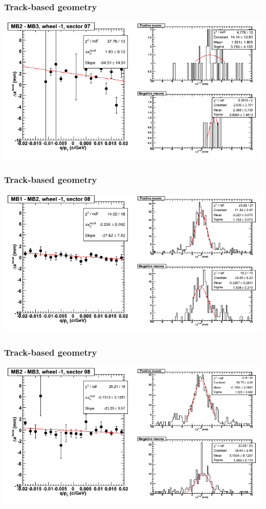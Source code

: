 \documentclass[compress]{beamer}
\begin{document}
\begin{frame}
\frametitle{Track-based geometry}
\includegraphics[width=\linewidth]{NOV4_segdiffs/dt13_resid_B_07_23.png}
\end{frame}

\begin{frame}
\frametitle{Track-based geometry}
\includegraphics[width=\linewidth]{NOV4_segdiffs/dt13_resid_B_08_12.png}
\end{frame}

\begin{frame}
\frametitle{Track-based geometry}
\includegraphics[width=\linewidth]{NOV4_segdiffs/dt13_resid_B_08_23.png}
\end{frame}
\end{document}
